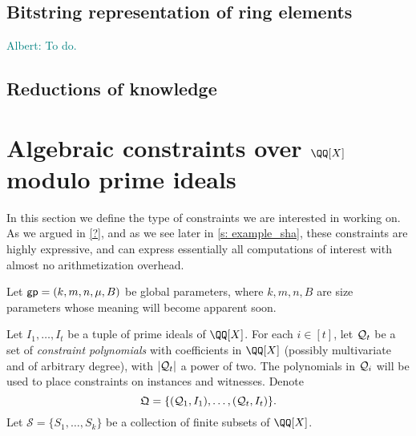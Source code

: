 \documentclass[11pt,letterpaper,usenames,dvipsnames]{article}
\newcommand{\albert}[1]{\textcolor{teal}{Albert: {#1}}}
\begin{document}
\subsection{Bitstring representation of ring elements}\label{s: bistring_reps}
\albert{To do.}

\subsection{Reductions of knowledge}

\section{Algebraic constraints over $\QQ[X]$ modulo prime ideals}

In this section we define the type of constraints we are interested in working on. As we argued in \cref{?}, and as we see later in \cref{s: example_sha}, these constraints are highly expressive, and can  express essentially all computations of interest with almost no arithmetization overhead.

\newcommand{\evalconstraints}{\text{\emph{Eval}}}
\newcommand{\mainQpolyring}{(\QQ[X]_{\leq B})}
\newcommand{\mainQpolyringmultilin}{(\QQ[X]_{\leq B})^{\multilin}}



%

\newcommand{\megaQ}{\mathfrak{Q}}
\renewcommand{\ff}{\mathbf{f}}
\newcommand{\cS}{\mathcal{S}}

Let $\mathsf{gp} = (k, m, n, \mu, B)$ be global parameters, where $k,m,n,B$ are size parameters whose meaning will become apparent soon. 

Let $I_1,\ldots, I_t$ be a tuple of prime ideals of $\QQ[X]$. For each $i\in [t]$, let $\mathcal{Q}_t$ be a set  of \emph{constraint polynomials} with coefficients in $\QQ[X]$ (possibly multivariate and of arbitrary degree), with $|\mathcal{Q}_t|$ a power of two.  The polynomials in $\mathcal{Q}_i$ will be used to place constraints on instances and witnesses.
Denote 
%
$$
\megaQ = \{(\cQ_1, I_1), \ldots, (\cQ_t, I_t)\}.
$$
%
Let $\cS=\{S_1, \ldots, S_k\}$ be a collection of finite subsets of $\QQ[X]$.
%
 
\end{document}
